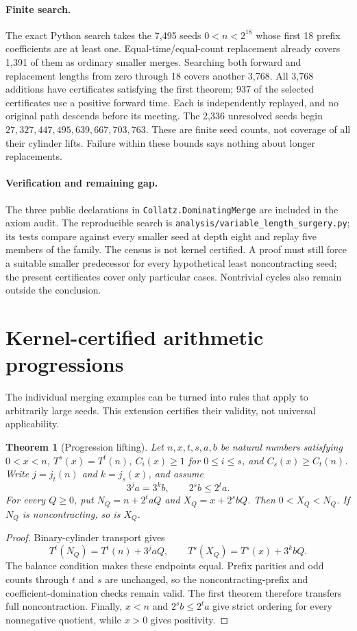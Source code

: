 \documentclass[10pt]{article}
\newtheorem{theorem}{Theorem}
\begin{document}
\paragraph{Finite search.}
The exact Python search takes the 7,495 seeds $0<n<2^{18}$ whose first
18 prefix coefficients are at least one. Equal-time/equal-count replacement
already covers 1,391 of them as ordinary smaller merges. Searching both
forward and replacement lengths from zero through 18 covers another 3,768.
All 3,768 additions have certificates satisfying the first theorem;
937 of the selected certificates use a positive forward time. Each is
independently replayed, and no original path descends before its meeting.
The 2,336 unresolved seeds begin $27,327,447,495,639,667,703,763$.
These are finite seed counts, not coverage of all their cylinder lifts.
Failure within these bounds says nothing about longer replacements.

\paragraph{Verification and remaining gap.}
The three public declarations in \texttt{Collatz.DominatingMerge} are
included in the axiom audit. The reproducible search is
\texttt{analysis/variable\_length\_surgery.py}; its tests compare against
every smaller seed at depth eight and replay five members of the family.
The census is not kernel certified. A proof must still force a suitable
smaller predecessor for every hypothetical least noncontracting seed;
the present certificates cover only particular cases. Nontrivial cycles
also remain outside the conclusion.

\newpage
\section*{Kernel-certified arithmetic progressions}
The individual merging examples can be turned into rules that apply to
arbitrarily large seeds. This extension certifies their validity, not
universal applicability.

\begin{theorem}[Progression lifting]
Let $n,x,t,s,a,b$ be natural numbers satisfying $0<x<n$,
$T^s(x)=T^t(n)$, $C_i(x)\geq1$ for $0\leq i\leq s$, and
$C_s(x)\geq C_t(n)$. Write $j=j_t(n)$ and $k=j_s(x)$, and assume
\[
3^ja=3^kb,\qquad 2^sb\leq2^ta.
\]
For every $Q\geq0$, put $N_Q=n+2^taQ$ and $X_Q=x+2^sbQ$.
Then $0<X_Q<N_Q$. If $N_Q$ is noncontracting, so is $X_Q$.
\end{theorem}
\begin{proof}
Binary-cylinder transport gives
\[
T^t(N_Q)=T^t(n)+3^jaQ,
\qquad T^s(X_Q)=T^s(x)+3^kbQ.
\]
The balance condition makes these endpoints equal. Prefix parities and
odd counts through $t$ and $s$ are unchanged, so the noncontracting-prefix
and coefficient-domination checks remain valid. The first theorem
therefore transfers full noncontraction. Finally, $x<n$ and $2^sb\leq2^ta$
give strict ordering for every nonnegative quotient, while $x>0$ gives
positivity.
\end{proof}
\end{document}

